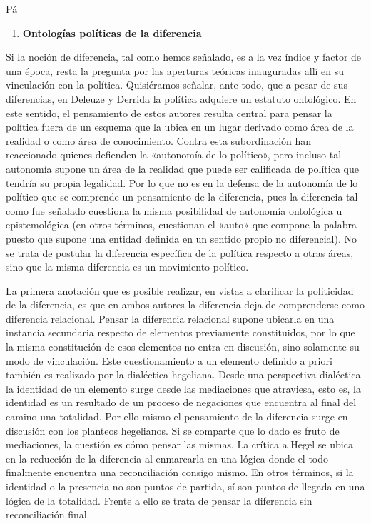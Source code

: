 Pá

\begin{enumerate}
\def\labelenumi{\arabic{enumi}.}
\item
  \textbf{Ontologías políticas de la diferencia}
\end{enumerate}

Si la noción de diferencia, tal como hemos señalado, es a la vez índice y factor de una época, resta la pregunta por las aperturas teóricas inauguradas allí en su vinculación con la política. Quisiéramos señalar, ante todo, que a pesar de sus diferencias, en Deleuze y Derrida la política adquiere un estatuto ontológico. En este sentido, el pensamiento de estos autores resulta central para pensar la política fuera de un esquema que la ubica en un lugar derivado como área de la realidad o como área de conocimiento. Contra esta subordinación han reaccionado quienes defienden la «autonomía de lo político», pero incluso tal autonomía supone un área de la realidad que puede ser calificada de política que tendría su propia legalidad. Por lo que no es en la defensa de la autonomía de lo político que se comprende un pensamiento de la diferencia, pues la diferencia tal como fue señalado cuestiona la misma posibilidad de autonomía ontológica u epistemológica (en otros términos, cuestionan el «auto» que compone la palabra puesto que supone una entidad definida en un sentido propio no diferencial). No se trata de postular la diferencia específica de la política respecto a otras áreas, sino que la misma diferencia es un movimiento político.

La primera anotación que es posible realizar, en vistas a clarificar la politicidad de la diferencia, es que en ambos autores la diferencia deja de comprenderse como diferencia relacional. Pensar la diferencia relacional supone ubicarla en una instancia secundaria respecto de elementos previamente constituidos, por lo que la misma constitución de esos elementos no entra en discusión, sino solamente su modo de vinculación. Este cuestionamiento a un elemento definido a priori también es realizado por la dialéctica hegeliana. Desde una perspectiva dialéctica la identidad de un elemento surge desde las mediaciones que atraviesa, esto es, la identidad es un resultado de un proceso de negaciones que encuentra al final del camino una totalidad. Por ello mismo el pensamiento de la diferencia surge en discusión con los planteos hegelianos. Si se comparte que lo dado es fruto de mediaciones, la cuestión es cómo pensar las mismas. La crítica a Hegel se ubica en la reducción de la diferencia al enmarcarla en una lógica donde el todo finalmente encuentra una reconciliación consigo mismo. En otros términos, si la identidad o la presencia no son puntos de partida, sí son puntos de llegada en una lógica de la totalidad. Frente a ello se trata de pensar la diferencia sin reconciliación final.

